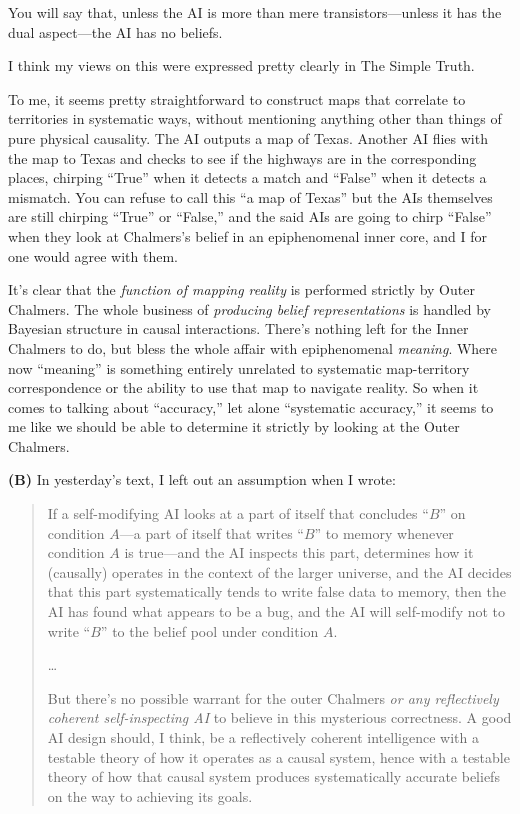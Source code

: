 {
 You will say that, unless the AI is more than mere
transistors---unless it has the dual aspect---the AI has no beliefs.}

{
 I think my views on this were expressed pretty clearly in The
Simple Truth.}

{
 To me, it seems pretty straightforward to construct maps that
correlate to territories in systematic ways, without mentioning
anything other than things of pure physical causality. The AI outputs a
map of Texas. Another AI flies with the map to Texas and checks to see
if the highways are in the corresponding places, chirping
``True'' when it detects a match and
``False'' when it detects a
mismatch. You can refuse to call this ``a map of
Texas'' but the AIs themselves are still chirping
``True'' or
``False,'' and the said AIs are
going to chirp ``False'' when they
look at Chalmers's belief in an epiphenomenal inner
core, and I for one would agree with them.}

{
 It's clear that the \textit{function of mapping
reality} is performed strictly by Outer Chalmers. The whole business of
\textit{producing belief representations} is handled by Bayesian
structure in causal interactions. There's nothing left
for the Inner Chalmers to do, but bless the whole affair with
epiphenomenal \textit{meaning}. Where now
``meaning'' is something entirely
unrelated to systematic map-territory correspondence or the ability to
use that map to navigate reality. So when it comes to talking about
``accuracy,'' let alone
``systematic accuracy,'' it seems to
me like we should be able to determine it strictly by looking at the
Outer Chalmers.}

{
 \textbf{(B)} In yesterday's text, I left out an
 assumption when I wrote:}

\begin{quotation}

{
 If a self-modifying AI looks at a part of itself that concludes
``$B$'' on condition $A$---a part of
itself that writes ``$B$'' to memory
whenever condition $A$ is true---and the AI inspects this part,
determines how it (causally) operates in the context of the larger
universe, and the AI decides that this part systematically tends to
write false data to memory, then the AI has found what appears to be a
bug, and the AI will self-modify not to write
``$B$'' to the belief pool under
condition $A$.}

{
 \ldots}

{
 But there's no possible warrant for the outer
Chalmers \textit{or any reflectively coherent self-inspecting AI} to
believe in this mysterious correctness. A good AI design should, I
think, be a reflectively coherent intelligence with a testable theory
of how it operates as a causal system, hence with a testable theory of
how that causal system produces systematically accurate beliefs on the
way to achieving its goals.}

\end{quotation}

